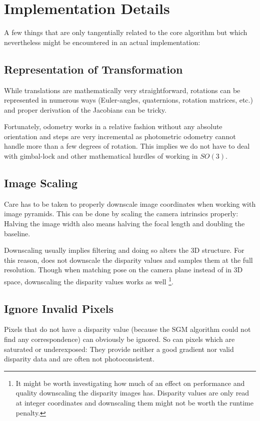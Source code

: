 \chapter{Implementation Details}

A few things that are only tangentially related to the core algorithm but which
nevertheless might be encountered in an actual implementation:

\section{Representation of Transformation}

While translations are mathematically very straightforward, rotations can be
represented in numerous ways (Euler-angles, quaternions, rotation matrices,
etc.) and proper derivation of the Jacobians can be tricky.

Fortunately, odometry works in a relative fashion without any absolute
orientation and steps are very incremental as photometric odometry cannot
handle more than a few degrees of rotation. This implies we do not have to deal
with gimbal-lock and other mathematical hurdles of working in $SO(3)$.

\section{Image Scaling}

Care has to be taken to properly downscale image coordinates when working with
image pyramids. This can be done by scaling the camera intrinsics properly:
Halving the image width also means halving the focal length and doubling the
baseline.

Downscaling usually implies filtering and doing so alters the 3D structure. For
this reason, \cite{comport2007odometry} does not downscale the disparity values and
samples them at the full resolution. Though when matching pose on the camera plane
instead of in 3D space, downscaling the disparity values works as well
\footnote{It might be worth investigating how much of an effect on performance
and quality downscaling the disparity images has. Disparity values are only
read at integer coordinates and downscaling them might not be worth the runtime
penalty.}.

\section{Ignore Invalid Pixels}

Pixels that do not have a disparity value (because the SGM algorithm could not
find any correspondence) can obviously be ignored. So can pixels which are
saturated or underexposed: They provide neither a good gradient nor valid
disparity data and are often not photoconsistent.

